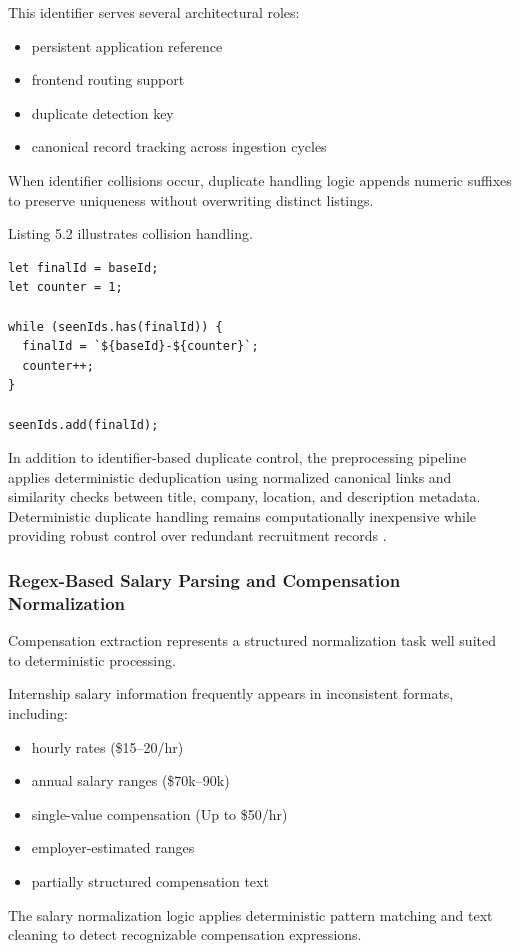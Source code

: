 This identifier serves several architectural roles:
\begin{itemize}[leftmargin=1.4em,itemsep=0.25em,topsep=0.25em]
\item persistent application reference
\item frontend routing support
\item duplicate detection key
\item canonical record tracking across ingestion cycles
\end{itemize}
When identifier collisions occur, duplicate handling logic appends numeric suffixes to preserve uniqueness without overwriting distinct listings.

Listing 5.2 illustrates collision handling.

\begin{lstlisting}[caption={Collision handling logic}]
let finalId = baseId;
let counter = 1;

while (seenIds.has(finalId)) {
  finalId = `${baseId}-${counter}`;
  counter++;
}

seenIds.add(finalId);
\end{lstlisting}

In addition to identifier-based duplicate control, the preprocessing pipeline applies deterministic deduplication using normalized canonical links and similarity checks between title, company, location, and description metadata. Deterministic duplicate handling remains computationally inexpensive while providing robust control over redundant recruitment records \cite{christen2012data, li2020survey}.

\subsubsection*{Regex-Based Salary Parsing and Compensation Normalization}

Compensation extraction represents a structured normalization task well suited to deterministic processing.

Internship salary information frequently appears in inconsistent formats, including:
\begin{itemize}[leftmargin=1.4em,itemsep=0.25em,topsep=0.25em]
\item hourly rates (\$15--20/hr)
\item annual salary ranges (\$70k--90k)
\item single-value compensation (Up to \$50/hr)
\item employer-estimated ranges
\item partially structured compensation text
\end{itemize}
The salary normalization logic applies deterministic pattern matching and text cleaning to detect recognizable compensation expressions.


